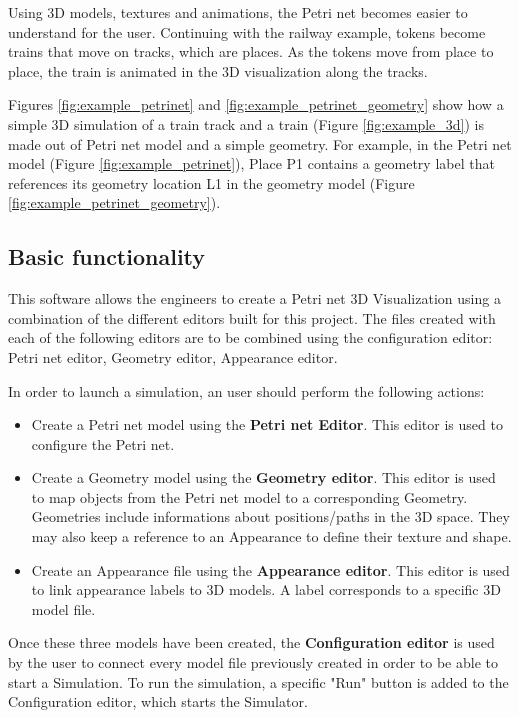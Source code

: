 Using 3D models, textures and animations, the Petri net becomes easier to understand for the user. Continuing with the railway example, tokens become trains that move on tracks, which are places. As the tokens move from place to place, the train is animated in the 3D visualization along the tracks.

Figures \ref{fig:example_petrinet} and \ref{fig:example_petrinet_geometry} show how a simple 3D simulation of a train track and a train (Figure \ref{fig:example_3d}) is made out of Petri net model and a simple geometry. For example, in the Petri net model (Figure \ref{fig:example_petrinet}), Place P1 contains a geometry label that references its geometry location L1 in the geometry model (Figure \ref{fig:example_petrinet_geometry}).

\newpage

\subsection{Basic functionality}
This software allows the engineers to create a Petri net 3D Visualization using a combination of the different editors built for this project.
The files created with each of the following editors are to be combined using the configuration editor: \newline
Petri net editor, Geometry editor, Appearance editor. 

In order to launch a simulation, an user should perform the following actions:

\begin{itemize}
  \item Create a Petri net model using the \textbf{Petri net Editor}. This editor is used to configure the Petri net.
  \item Create a Geometry model using the \textbf{Geometry editor}. This editor is used to map objects from the Petri net model to a corresponding Geometry. Geometries include informations about positions/paths in the 3D space. They may also keep a reference to an Appearance to define their texture and shape.
  \item Create an Appearance file using the \textbf{Appearance editor}. This editor is used to link appearance labels to 3D models. A label corresponds to a specific 3D model file. 
\end{itemize}

Once these three models have been created, the \textbf{Configuration editor} is used by the user to connect every model file previously created in order to be able to start a Simulation. 
To run the simulation, a specific "Run" button is added to the Configuration editor, which starts the Simulator.
\newline

